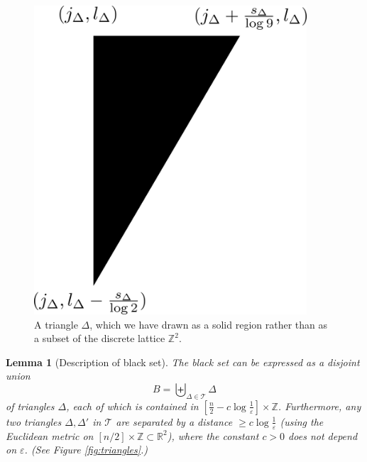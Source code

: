 \documentclass[12pt,a4paper,reqno]{amsart}
\numberwithin{equation}{section}
\theoremstyle{plain}
\newtheorem{lemma}[theorem]{Lemma}
\theoremstyle{definition}
\newcommand\R{\mathbb{R}}
\newcommand\Z{\mathbb{Z}}
\newcommand\eps{\varepsilon}
\begin{document}
\begin{figure} [t]
\centering
\includegraphics[width=4in]{./triangle.png}
\caption{A triangle $\Delta$, which we have drawn as a solid region rather than as a subset of the discrete lattice $\Z^2$.}
\label{fig:triangle}
\end{figure}


\begin{lemma}[Description of black set]\label{black}  The black set can be expressed as a disjoint union
$$ B = \biguplus_{\Delta \in {\mathcal T}} \Delta$$
of triangles $\Delta$, each of which is contained in $[\frac{n}{2} - c \log \frac{1}{\eps}] \times \Z$.
Furthermore, any two triangles $\Delta,\Delta'$ in ${\mathcal T}$ are separated by a distance $\geq c \log \frac{1}{\eps}$ (using the Euclidean metric on $[n/2] \times \Z \subset \R^2$), where the constant $c>0$ does not depend on $\eps$.  (See Figure \ref{fig:triangles}.)
\end{lemma}
\end{document}

